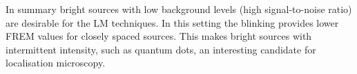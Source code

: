 In summary bright sources with low background levels (high signal-to-noise ratio) are desirable for the LM techniques. In this setting the blinking provides lower FREM values for closely spaced sources. This makes bright sources with intermittent intensity, such as quantum dots, an interesting candidate for localisation microscopy.


%
%



